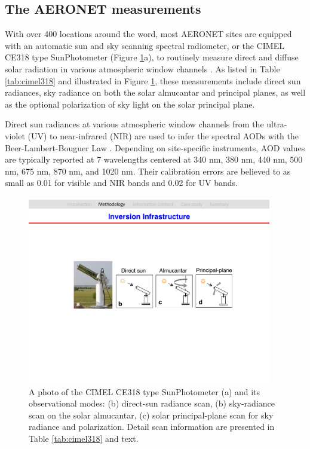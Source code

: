 \subsection{The AERONET measurements} \label{subsec:cimel318}

With over 400 locations around the word, most AERONET sites are equipped with
an automatic sun and sky scanning spectral radiometer, or the CIMEL CE318 type
SunPhotometer (Figure \ref{fig:cimel318}a), to routinely measure direct and 
diffuse solar radiation in various atmospheric window channels \citep{Holben98}. 
As listed in Table \ref{tab:cimel318} and illustrated in Figure 
\ref{fig:cimel318}, these measurements include direct sun radiances, sky 
radiance on both the solar almucantar and principal planes, as well as the 
optional polarization of sky light on the solar principal plane.

Direct sun radiances at various atmospheric window channels from the
ultra-violet (UV) to near-infrared (NIR) are used to infer the spectral AODs with the
Beer-Lambert-Bouguer Law \citep{Holben98,Smirnov00}. Depending on site-specific
instruments, AOD values are typically reported at 7 wavelengths centered at 340
nm, 380 nm, 440 nm, 500 nm, 675 nm, 870 nm, and 1020 nm. Their calibration
errors are believed to as small as 0.01 for visible and NIR bands and 0.02 for
UV bands.

\begin{figure}[t]
  \centering
  \includegraphics[width={0.95\textwidth}]{figures/cimel318.pdf}
  \caption{A photo of the CIMEL CE318 type SunPhotometer (a) and its 
observational modes: (b) direct-sun radiance scan, (b) sky-radiance scan
on the solar almucantar, (c) solar principal-plane scan for sky radiance
and polarization. Detail scan information are presented in Table
\ref{tab:cimel318} and text.}
  \label{fig:cimel318}
\end{figure}

